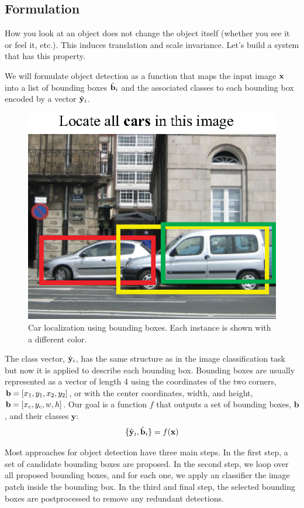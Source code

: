 
\subsection{Formulation}

How you look at an object does not change the object itself (whether you see it or feel it, etc.). This induces translation and scale invariance. Let's build a system that has this property.

We will formulate object detection as a function that maps the input image ${\bf x}$ into a list of bounding boxes $\hat {\bf b}_i$ and the associated classes to each bounding box encoded by a vector $\hat {\bf y}_i$.
\begin{figure}[h]
    \centerline{
        \includegraphics[width=0.4\linewidth]{figures/object_recognition/object_detection_bb.eps}
    }
    \caption{Car localization using bounding boxes. Each instance is shown with a different color.}
    \label{fig:object_detection_bb}
\end{figure}


The class vector, $\hat {\bf y}_i$, has the same structure as in the image classification task but now it is applied to describe each bounding box. Bounding boxes are usually represented as a vector of length 4 using the coordinates of the two corners, ${\bf b} = \left[ x_1, y_1, x_2, y_2 \right]$, or with the center coordinates, width, and height, ${\bf b} = \left[ x_c, y_c, w, h \right]$.
Our goal is a function $f$ that outputs a set of bounding boxes, $\mathbf{b}$, and their classes $\mathbf{y}$:
\begin{equation}
    \{\hat {\bf y}_i, \hat {\bf b}_i\} = f({\bf x})
\end{equation}

Most approaches for object detection have three main steps. In the first step, a set of candidate bounding boxes are proposed. In the second step, we loop over all proposed bounding boxes, and for each one, we apply an classifier the image patch inside the bounding box. In the third and final step, the selected bounding boxes are postprocessed to remove any redundant detections.

